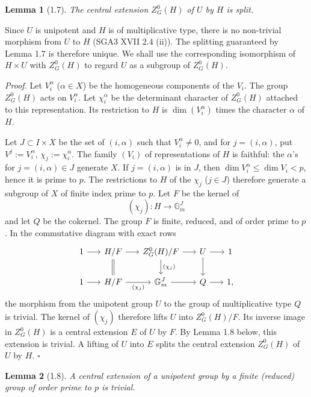 \documentclass[10pt]{article}
\newcommand{\Gm}{\mathbb G_m}
\theoremstyle{deligne}
\newtheorem*{lemma*}{Lemma}
\newenvironment{proofdel}{\textit{Proof.}}{\hfill$\square$}
\begin{document}
\begin{lemma*}[1.7]
The central extension \(Z^0_G(H)\) of \(U\) by \(H\) is split.
\end{lemma*}

Since \(U\) is unipotent and \(H\) is of multiplicative type, there is no non-trivial morphism from \(U\) to \(H\) (SGA3 XVII 2.4 (ii)). The splitting guaranteed by Lemma 1.7 is therefore unique. We shall use the corresponding isomorphism of \(H\times U\) with \(Z^0_G(H)\) to regard \(U\) as a subgroup of \(Z^0_G(H)\).

\begin{proofdel}
Let \(V^\alpha_i\) (\(\alpha\in X\)) be the homogeneous components of the \(V_i\). The group \(Z^0_G(H)\) acts on \(V^\alpha_i\). Let \(\chi^\alpha_i\) be the determinant character of \(Z^0_G(H)\) attached to this representation. Its restriction to \(H\) is \(\dim(V^\alpha_i)\) times the character \(\alpha\) of \(H\).

Let \(J\subset I\times X\) be the set of \((i,\alpha)\) such that \(V^\alpha_i\ne0\), and for \(j=(i,\alpha)\), put \(V^j:=V^\alpha_i\), \(\chi_j:=\chi^\alpha_i\). The family \((V_i)\) of representations of \(H\) is faithful: the \(\alpha\)'s for \(j=(i,\alpha)\in J\) generate \(X\). If \(j=(i,\alpha)\) is in \(J\), then \(\dim V^\alpha_i\le\dim V_i<p\), hence it is prime to \(p\). The restrictions to \(H\) of the \(\chi_j\) (\(j\in J\)) therefore generate a subgroup of \(X\) of finite index prime to \(p\). Let \(F\) be the kernel of
\[
  (\chi_j):H\longrightarrow \Gm^J
\]
and let \(Q\) be the cokernel. The group \(F\) is finite, reduced, and of order prime to \(p\). In the commutative diagram with exact rows
\[
\begin{tikzcd}[column sep=1.6em]
1 \arrow[r] & H/F \arrow[r] \arrow[d,equals] &
Z^0_G(H)/F \arrow[r] \arrow[d,"{(\chi_j)}"] &
U \arrow[r] \arrow[d] & 1\\
1 \arrow[r] & H/F \arrow[r,"{(\chi_j)}"'] &
\Gm^J \arrow[r] &
Q \arrow[r] & 1 ,
\end{tikzcd}
\]
the morphism from the unipotent group \(U\) to the group of multiplicative type \(Q\) is trivial. The kernel of \((\chi_j)\) therefore lifts \(U\) into \(Z^0_G(H)/F\). Its inverse image in \(Z^0_G(H)\) is a central extension \(E\) of \(U\) by \(F\). By Lemma 1.8 below, this extension is trivial. A lifting of \(U\) into \(E\) splits the central extension \(Z^0_G(H)\) of \(U\) by \(H\).
\end{proofdel}

\begin{lemma*}[1.8]
A central extension of a unipotent group by a finite (reduced) group of order prime to \(p\) is trivial.
\end{lemma*}
\end{document}
